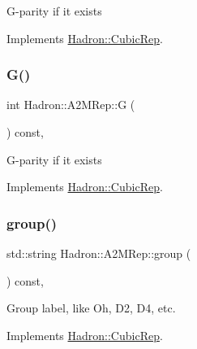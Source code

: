 G-\/parity if it exists 

Implements \mbox{\hyperlink{structHadron_1_1CubicRep_a52104e43266d1614c00bbd1c3b395458}{Hadron\+::\+Cubic\+Rep}}.

\mbox{\label{structHadron_1_1A2MRep_a2850984bf027d7ac1b39ce7ff94c6d00}} 
\subsubsection{\texorpdfstring{G()}{G()}\hspace{0.1cm}{\footnotesize\ttfamily [3/3]}}
{\footnotesize\ttfamily int Hadron\+::\+A2\+M\+Rep\+::G (\begin{DoxyParamCaption}{ }\end{DoxyParamCaption}) const\hspace{0.3cm}{\ttfamily [inline]}, {\ttfamily [virtual]}}

G-\/parity if it exists 

Implements \mbox{\hyperlink{structHadron_1_1CubicRep_a52104e43266d1614c00bbd1c3b395458}{Hadron\+::\+Cubic\+Rep}}.

\mbox{\label{structHadron_1_1A2MRep_acc01c7c94d15b610d4366faa2bc3afaf}} 
\subsubsection{\texorpdfstring{group()}{group()}\hspace{0.1cm}{\footnotesize\ttfamily [1/3]}}
{\footnotesize\ttfamily std\+::string Hadron\+::\+A2\+M\+Rep\+::group (\begin{DoxyParamCaption}{ }\end{DoxyParamCaption}) const\hspace{0.3cm}{\ttfamily [inline]}, {\ttfamily [virtual]}}

Group label, like Oh, D2, D4, etc. 

Implements \mbox{\hyperlink{structHadron_1_1CubicRep_a0748f11ec87f387062c8e8981339a29c}{Hadron\+::\+Cubic\+Rep}}.

\mbox{\label{structHadron_1_1A2MRep_acc01c7c94d15b610d4366faa2bc3afaf}} 
